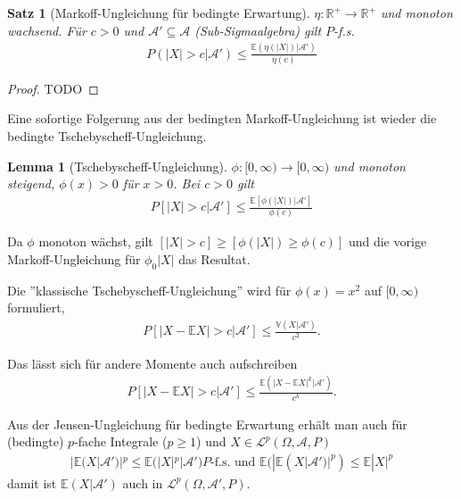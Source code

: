 \documentclass[]{article}
\newtheorem{theorem}{Satz}
\newtheorem{lemma}{Lemma}
\begin{document}
\begin{theorem}[Markoff-Ungleichung für bedingte Erwartung]
	$\eta:\mathbb{R}^+\rightarrow\mathbb{R}^+$ und monoton wachsend. Für $c>0$ und $\mathcal{A}' \subseteq \mathcal{A}$ (Sub-Sigmaalgebra) gilt $P$-f.s.
	\begin{align*}
		P(|X|>c|\mathcal{A}') \leq \frac{\mathbb{E}(\eta(|X|)|\mathcal{A}')}{\eta(c)}
	\end{align*}
\end{theorem}

\begin{proof}
	TODO
\end{proof}

Eine sofortige Folgerung aus der bedingten Markoff-Ungleichung ist wieder die bedingte Tschebyscheff-Ungleichung.

\begin{lemma}[Tschebyscheff-Ungleichung]
	$\phi:[0,\infty)\rightarrow[0,\infty)$ und monoton steigend, $\phi(x)>0$ für $x>0$. Bei $c>0$ gilt
	\begin{align*}
		P[|X|>c|\mathcal{A}'] \leq \frac{\mathbb{E}[\phi(|X|)|\mathcal{A}']}{\phi(c)}
	\end{align*}
\end{lemma}

Da $\phi$ monoton wächst, gilt $[|X|>c]\geq[\phi(|X|)\geq \phi(c)]$ und die vorige Markoff-Ungleichung für $\phi_0|X|$ das Resultat.

Die ''klassische Tschebyscheff-Ungleichung'' wird für $\phi(x)=x^2$ auf $[0,\infty)$ formuliert,
\begin{align*}
	P[|X-\mathbb{E}X|>c |\mathcal{A}'] \leq \frac{\mathbb{V}(X|\mathcal{A}')}{c^2}.
\end{align*}

Das lässt sich für andere Momente auch aufschreiben
\begin{align*}
	P[|X-\mathbb{E}X|>c |\mathcal{A}'] \leq \frac{\mathbb{E}(|X-\mathbb{E}X|^k |\mathcal{A}')}{c^k}.
\end{align*}

Aus der Jensen-Ungleichung für bedingte Erwartung erhält man auch für (bedingte) $p$-fache Integrale ($p\geq1$) und $X\in \mathcal{L}^p(\Omega, \mathcal{A}, P)$
\begin{align*}
	|\mathbb{E}(X|\mathcal{A}')|^p \leq \mathbb{E}(|X|^p | \mathcal{A}') P\text{-f.s. und } \mathbb{E}(|\mathbb{E}(X|\mathcal{A}')|^p) \leq \mathbb{E}|X|^p
\end{align*}
damit ist $\mathbb{E}(X|\mathcal{A}')$ auch in $\mathcal{L}^p(\Omega, \mathcal{A}', P)$.
\end{document}
